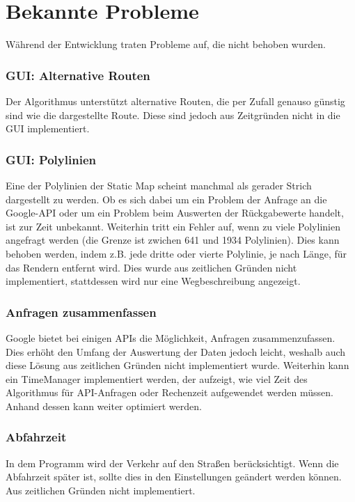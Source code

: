 \chapter{Bekannte Probleme}
\label{ch:problems}

Während der Entwicklung traten Probleme auf, die nicht behoben wurden.

\subsection{GUI: Alternative Routen}
\label{sec:alternative-routes}
Der Algorithmus unterstützt alternative Routen, die per Zufall genauso günstig sind wie die dargestellte Route. Diese sind jedoch aus Zeitgründen nicht in die GUI implementiert.

\subsection{GUI: Polylinien}
\label{sec:polylines}
Eine der Polylinien der Static Map scheint manchmal als gerader Strich dargestellt zu werden. Ob es sich dabei um ein Problem der Anfrage an die Google-API oder um ein Problem beim Auswerten der Rückgabewerte handelt, ist zur Zeit unbekannt. Weiterhin tritt ein Fehler auf, wenn zu viele Polylinien angefragt werden (die Grenze ist zwichen 641 und 1934 Polylinien). Dies kann behoben werden, indem z.B. jede dritte oder vierte Polylinie, je nach Länge, für das Rendern entfernt wird. Dies wurde aus zeitlichen Gründen nicht implementiert, stattdessen wird nur eine Wegbeschreibung angezeigt.

\subsection{Anfragen zusammenfassen}
\label{anfragen-zusammenfassen}
Google bietet bei einigen APIs die Möglichkeit, Anfragen zusammenzufassen. Dies erhöht den Umfang der Auswertung der Daten jedoch leicht, weshalb auch diese Lösung aus zeitlichen Gründen nicht implementiert wurde. Weiterhin kann ein TimeManager implementiert werden, der aufzeigt, wie viel Zeit des Algorithmus für API-Anfragen oder Rechenzeit aufgewendet werden müssen. Anhand dessen kann weiter optimiert werden.

\subsection{Abfahrzeit}
\label{abfahrzeit}
In dem Programm wird der Verkehr auf den Straßen berücksichtigt. Wenn die Abfahrzeit später ist, sollte dies in den Einstellungen geändert werden können. Aus zeitlichen Gründen nicht implementiert.